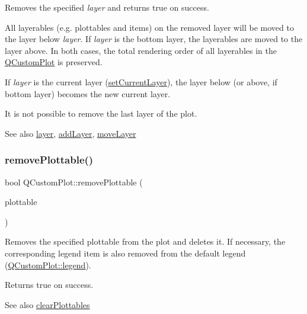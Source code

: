 Removes the specified {\itshape layer} and returns true on success.

All layerables (e.\+g. plottables and items) on the removed layer will be moved to the layer below {\itshape layer}. If {\itshape layer} is the bottom layer, the layerables are moved to the layer above. In both cases, the total rendering order of all layerables in the \hyperlink{class_q_custom_plot}{Q\+Custom\+Plot} is preserved.

If {\itshape layer} is the current layer (\hyperlink{class_q_custom_plot_a73a6dc47c653bb6f8f030abca5a11852}{set\+Current\+Layer}), the layer below (or above, if bottom layer) becomes the new current layer.

It is not possible to remove the last layer of the plot.

\begin{DoxySeeAlso}{See also}
\hyperlink{class_q_custom_plot_a0a96244e7773b242ef23c32b7bdfb159}{layer}, \hyperlink{class_q_custom_plot_ad5255393df078448bb6ac83fa5db5f52}{add\+Layer}, \hyperlink{class_q_custom_plot_ae896140beff19424e9e9e02d6e331104}{move\+Layer} 
\end{DoxySeeAlso}
\mbox{\label{class_q_custom_plot_af3dafd56884208474f311d6226513ab2}} 
\subsubsection{\texorpdfstring{remove\+Plottable()}{removePlottable()}\hspace{0.1cm}{\footnotesize\ttfamily [1/2]}}
{\footnotesize\ttfamily bool Q\+Custom\+Plot\+::remove\+Plottable (\begin{DoxyParamCaption}\item[{\hyperlink{class_q_c_p_abstract_plottable}{Q\+C\+P\+Abstract\+Plottable} $\ast$}]{plottable }\end{DoxyParamCaption})}

Removes the specified plottable from the plot and deletes it. If necessary, the corresponding legend item is also removed from the default legend (\hyperlink{class_q_custom_plot_a4eadcd237dc6a09938b68b16877fa6af}{Q\+Custom\+Plot\+::legend}).

Returns true on success.

\begin{DoxySeeAlso}{See also}
\hyperlink{class_q_custom_plot_a9a409bb3201878adb7ffba1c89c4e004}{clear\+Plottables} 
\end{DoxySeeAlso}
\mbox{\label{class_q_custom_plot_afc210e0021480f8119bccf37839dbcc8}} 
